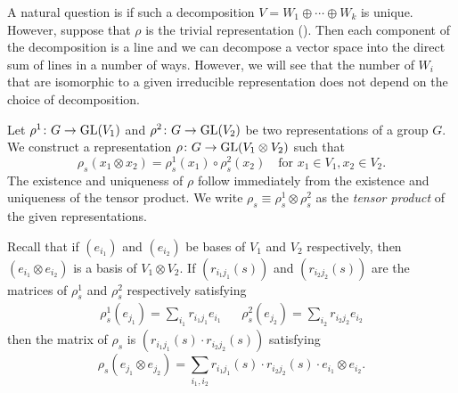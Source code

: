 \documentclass[letterpaper, 11pt, oneside]{book}
\begin{document}
A natural question is if such a decomposition $V = W_{1} \oplus \cdots \oplus W_{k}$ is unique.
However, suppose that $\rho$ is the trivial representation ().
Then each component of the decomposition is a line and we can decompose a vector space into the direct sum of lines in a number of ways.
However, we will see that the number of $W_{i}$ that are isomorphic to a given irreducible representation does not depend on the choice of decomposition.

\begin{defn}\label{defn:tensor_kronecker_product}
  Let $\rho^{1}\colon G \to \operatorname{GL}(V_{1})$ and $\rho^{2}\colon G \to \operatorname{GL}(V_{2})$ be two representations of a group $G$.
  We construct a representation $\rho\colon G \to \operatorname{GL}(V_{1} \otimes V_{2})$ such that
  \[
    \rho_{s}(x_{1} \otimes x_{2}) = \rho_{s}^{1}(x_{1}) \circ \rho_{s}^{2}(x_{2}) \quad \text{for } x_{1} \in V_{1}, x_{2} \in V_{2}.
  \]
  The existence and uniqueness of $\rho$ follow immediately from the existence and uniqueness of the tensor product.
  We write $\rho_{s} \equiv \rho_{s}^{1} \otimes \rho_{s}^{2}$ as the \emph{tensor product} of the given representations.
\end{defn}

Recall that if $(e_{i_{1}})$ and $(e_{i_{2}})$ be bases of $V_{1}$ and $V_{2}$ respectively, then $(e_{i_{1}} \otimes e_{i_{2}})$ is a basis of $V_{1} \otimes V_{2}$.
If $(r_{i_{1}j_{1}}(s))$ and $(r_{i_{2}j_{2}}(s))$ are the matrices of $\rho_{s}^{1}$ and $\rho_{s}^{2}$ respectively satisfying
\begin{align*}
  \rho_{s}^{1}(e_{j_{1}}) = \sum_{i_{1}} r_{i_{1}j_{1}} e_{i_{1}} && \rho_{s}^{2}(e_{j_{2}}) = \sum_{i_{2}} r_{i_{2}j_{2}} e_{i_{2}}
\end{align*}
then the matrix of $\rho_{s}$ is $(r_{i_{1}j_{1}}(s) \cdot r_{i_{2}j_{2}}(s))$ satisfying
\[
  \rho_{s}(e_{j_{1}} \otimes e_{j_{2}}) = \sum_{i_{1}, i_{2}} r_{i_{1}j_{1}}(s) \cdot r_{i_{2}j_{2}}(s) \cdot e_{i_{1}} \otimes e_{i_{2}}.
\]
\end{document}
